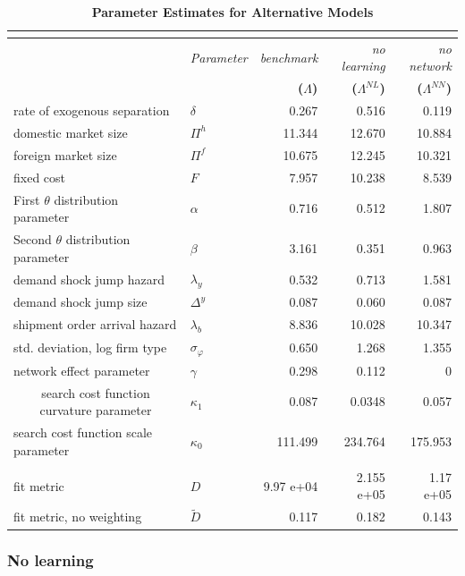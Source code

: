 \begin{table}
    \centering
{\small 
\begin{tabular}{llrrr}
\multicolumn{5}{c}{\textbf{}} \\ \hline\hline
& \textit{Parameter} & \textit{benchmark} & \textit{no learning} & \textit{%
no network} \\ 
&  & \textbf{(}$\Lambda $\textbf{)} & \textbf{(}$\Lambda ^{NL}$\textbf{)} & 
\textbf{(}$\Lambda ^{NN}$\textbf{)} \\ \cline{2-5}
rate of exogenous separation & $\delta $ & 0.267 & 0.516 & 0.119 \\ 
domestic market size & $\Pi ^{h}$ & 11.344 & 12.670 & 10.884 \\ 
foreign market size & $\Pi ^{f}$ & 10.675 & 12.245 & 10.321 \\ 
fixed cost & $F$ & 7.957 & 10.238 & 8.539 \\ 
First $\theta $ distribution parameter & $\alpha $ & 0.716 & 0.512 & 1.807
\\ 
Second $\theta $ distribution parameter & $\beta $ & 3.161 & 0.351 & 0.963
\\ 
demand shock jump hazard & $\lambda _{y}$ & 0.532 & 0.713 & 1.581 \\ 
demand shock jump size & $\Delta ^{y}$ & 0.087 & 0.060 & 0.087 \\ 
shipment order arrival hazard & $\lambda _{b}$ & 8.836 & 10.028 & 10.347 \\ 
std. deviation, log firm type & $\sigma _{\varphi }$ & 0.650 & 1.268 & 1.355
\\ 
network effect parameter & $\gamma $ & 0.298 & 0.112 & 0 \\ 
\multicolumn{1}{c}{search cost function curvature parameter} & $\kappa _{1}$
& 0.087 & 0.0348 & 0.057 \\ 
search cost function scale parameter & $\kappa _{0}$ & 111.499 & 234.764 & 
175.953 \\ 
&  &  &  &  \\ 
fit metric & $D$ & 9.97 e+04 & 2.155 e+05 & 1.17 e+05 \\ 
fit metric, no weighting & $\widetilde{D}$ & 0.117 & 0.182 & 0.143 \\ \hline
\end{tabular}%
}
\caption{\textbf{Parameter Estimates for Alternative Models}}
\label{tab:alt_est}
\end{table}

\bigskip



\subsubsection{No learning}

